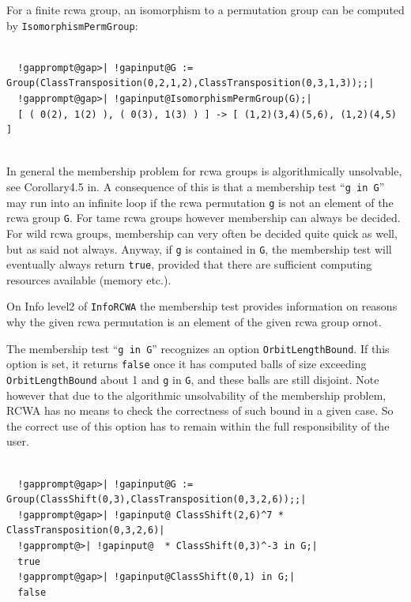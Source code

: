 \documentclass[a4paper,11pt]{report}
\begin{document}
{{\begin{Verbatim}[commandchars=!@|,fontsize=\small,frame=single,label=Example]
\end{Verbatim}
  For a finite rcwa group, an isomorphism to a permutation group can be computed
by \texttt{IsomorphismPermGroup}: 
\begin{Verbatim}[commandchars=!@|,fontsize=\small,frame=single,label=Example]
  
  !gapprompt@gap>| !gapinput@G := Group(ClassTransposition(0,2,1,2),ClassTransposition(0,3,1,3));;|
  !gapprompt@gap>| !gapinput@IsomorphismPermGroup(G);|
  [ ( 0(2), 1(2) ), ( 0(3), 1(3) ) ] -> [ (1,2)(3,4)(5,6), (1,2)(4,5) ]
  
\end{Verbatim}
   In general the membership problem for rcwa groups is algorithmically
unsolvable, see Corollary{\nobreakspace}4.5 in{\nobreakspace}\cite{Kohl09}. A consequence of this is that a membership test ``\texttt{g in G}'' may run into an infinite loop if the rcwa permutation \texttt{g} is not an element of the rcwa group \texttt{G}. For tame rcwa groups however membership can always be decided. For wild rcwa
groups, membership can very often be decided quite quick as well, but
\texttt{}\texttt{} as said
\texttt{}\texttt{} not always. Anyway, if \texttt{g} is contained in \texttt{G}, the membership test will eventually always return \texttt{true}, provided that there are sufficient computing resources available (memory
etc.). 

 On Info level{\nobreakspace}2 of \texttt{InfoRCWA} the membership test provides information on reasons why the given rcwa
permutation is an element of the given rcwa group or{\nobreakspace}not. 

 The membership test ``\texttt{g in G}'' recognizes an option \texttt{OrbitLengthBound}. If this option is set, it returns \texttt{false} once it has computed balls of size exceeding \texttt{OrbitLengthBound} about 1 and \texttt{g} in \texttt{G}, and these balls are still disjoint. Note however that due to the algorithmic
unsolvability of the membership problem, \textsf{RCWA} has no means to check the correctness of such bound in a given case. So the
correct use of this option has to remain within the full responsibility of the
user. 
\begin{Verbatim}[commandchars=!@|,fontsize=\small,frame=single,label=Example]
  
  !gapprompt@gap>| !gapinput@G := Group(ClassShift(0,3),ClassTransposition(0,3,2,6));;|
  !gapprompt@gap>| !gapinput@ ClassShift(2,6)^7 * ClassTransposition(0,3,2,6)|
  !gapprompt@>| !gapinput@  * ClassShift(0,3)^-3 in G;|
  true
  !gapprompt@gap>| !gapinput@ClassShift(0,1) in G;|
  false
  

\end{Verbatim}}}
\end{document}
